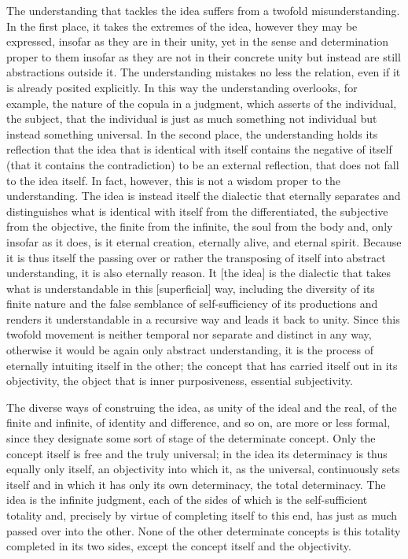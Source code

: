 The understanding that tackles the idea
suffers from a twofold misunderstanding.
In the first place, it takes the extremes of the idea,
however they may be expressed, insofar as they are in their unity,
yet in the sense and determination proper to them
insofar as they are not in their concrete unity
but instead are still abstractions outside it.
The understanding mistakes no less the relation,
even if it is already posited explicitly.
In this way the understanding overlooks, for example,
the nature of the copula in a judgment,
which asserts of the individual, the subject,
that the individual is just as much
something not individual
but instead something universal.
In the second place, the understanding holds its reflection that
the idea that is identical with itself
contains the negative of itself
(that it contains the contradiction)
to be an external reflection,
that does not fall to the idea itself.
In fact, however, this is not a wisdom
proper to the understanding.
The idea is instead itself the dialectic that
eternally separates and distinguishes what is
identical with itself from the differentiated,
the subjective from the objective,
the finite from the infinite,
the soul from the body and,
only insofar as it does,
is it eternal creation,
eternally alive,
and eternal spirit.
Because it is thus itself the passing over
or rather the transposing of itself
into abstract understanding,
it is also eternally reason.
It [the idea] is the dialectic that
takes what is understandable in this [superficial] way,
including the diversity of its finite nature
and the false semblance of self-sufficiency of its productions
and renders it understandable in a recursive way
and leads it back to unity.
Since this twofold movement is
neither temporal nor separate and distinct in any way,
otherwise it would be again only abstract understanding,
it is the process of eternally intuiting itself in the other;
the concept that has carried itself out in its objectivity,
the object that is inner purposiveness, essential subjectivity.

The diverse ways of construing the idea,
as unity of the ideal and the real,
of the finite and infinite,
of identity and difference,
and so on, are more or less formal,
since they designate some sort of
stage of the determinate concept.
Only the concept itself is free and the truly universal;
in the idea its determinacy is thus equally only itself,
an objectivity into which it, as the universal,
continuously sets itself and in which it has only
its own determinacy, the total determinacy.
The idea is the infinite judgment,
each of the sides of which is
the self-sufficient totality and,
precisely by virtue of completing itself to this end,
has just as much passed over into the other.
None of the other determinate concepts is
this totality completed in its two sides,
except the concept itself and the objectivity.

